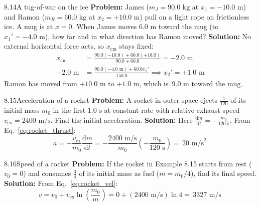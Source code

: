 \documentclass[11pt,a4paper,openany,oneside]{book}
\newcommand{\eqbox}[1]{\boxed{\,#1\,}}
\newcommand{\diff}{\mathrm{d}}
\numberwithin{equation}{chapter}
\newcommand{\bk}[1]{\texorpdfstring{\enspace{\normalfont\small\color{slate}[Book #1]}}{ [Book #1]}}
\begin{document}
\begin{example}{8.14}{A tug-of-war on the ice\bk{p.\ 260}}
\textbf{Problem:} James ($m_J = 90.0\text{ kg}$ at $x_1 = -10.0\text{ m}$) and Ramon ($m_R = 60.0\text{ kg}$ at $x_2 = +10.0\text{ m}$) pull on a light rope on frictionless ice. A mug is at $x=0$. When James moves $6.0\text{ m}$ toward the mug (to $x_1' = -4.0\text{ m}$), how far and in what direction has Ramon moved?
\tcblower
\textbf{Solution:} No external horizontal force acts, so $x_{\text{cm}}$ stays fixed:
\begin{align*}
  x_{\text{cm}} &= \frac{90.0(-10.0) + 60.0(+10.0)}{90.0 + 60.0} = -2.0\text{ m}\\
  -2.0\text{ m} &= \frac{90.0(-4.0\text{ m}) + 60.0 x_2'}{150.0} \implies x_2' = +1.0\text{ m}
\end{align*}
Ramon has moved from $+10.0\text{ m}$ to $+1.0\text{ m}$, which is $\eqbox{9.0\text{ m}\text{ toward the mug}}$.
\end{example}

\begin{example}{8.15}{Acceleration of a rocket\bk{p.\ 264}}
\textbf{Problem:} A rocket in outer space ejects $\frac{1}{120}$ of its initial mass $m_0$ in the first $1.0\text{ s}$ at constant rate with relative exhaust speed $v_{\text{ex}} = 2400\text{ m/s}$. Find the initial acceleration.
\tcblower
\textbf{Solution:} Here $\frac{\diff m}{\diff t} = -\frac{m_0}{120\text{ s}}$. From Eq.\ \eqref{eq:rocket_thrust}:
\begin{equation*}
  a = -\frac{v_{\text{ex}}}{m_0}\frac{\diff m}{\diff t} = -\frac{2400\text{ m/s}}{m_0}\!\left(-\frac{m_0}{120\text{ s}}\right) = \eqbox{20\text{ m/s}^2}
\end{equation*}
\end{example}

\begin{example}{8.16}{Speed of a rocket\bk{p.\ 265}}
\textbf{Problem:} If the rocket in Example 8.15 starts from rest ($v_0=0$) and consumes $\frac{3}{4}$ of its initial mass as fuel ($m = m_0/4$), find its final speed.
\tcblower
\textbf{Solution:} From Eq.\ \eqref{eq:rocket_vel}:
\begin{equation*}
  v = v_0 + v_{\text{ex}}\ln\!\left(\frac{m_0}{m}\right) = 0 + (2400\text{ m/s})\ln 4 = \eqbox{3327\text{ m/s}}
\end{equation*}
\end{example}
\end{document}

